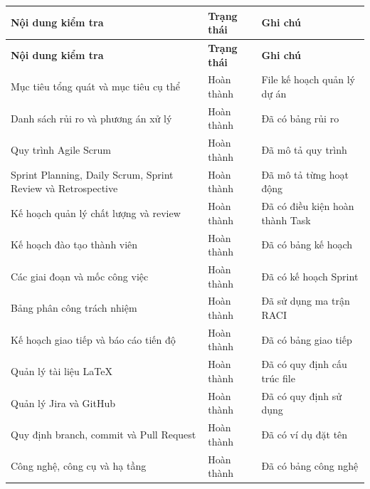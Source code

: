 \documentclass[12pt,a4paper]{article}
\begin{document}
	\begin{longtable}{
			|p{8.8cm}
			|>{\centering\arraybackslash}p{2.3cm}
			|p{3.3cm}|
		}
		\hline
		\textbf{Nội dung kiểm tra} &
		\textbf{Trạng thái} &
		\textbf{Ghi chú} \\
		\hline
		\endfirsthead
		
		\hline
		\textbf{Nội dung kiểm tra} &
		\textbf{Trạng thái} &
		\textbf{Ghi chú} \\
		\hline
		\endhead
		
		Mục tiêu tổng quát và mục tiêu cụ thể &
		Hoàn thành &
		File kế hoạch quản lý dự án \\
		\hline
		
		Danh sách rủi ro và phương án xử lý &
		Hoàn thành &
		Đã có bảng rủi ro \\
		\hline
		
		Quy trình Agile Scrum &
		Hoàn thành &
		Đã mô tả quy trình \\
		\hline
		
		Sprint Planning, Daily Scrum, Sprint Review và Retrospective &
		Hoàn thành &
		Đã mô tả từng hoạt động \\
		\hline
		
		Kế hoạch quản lý chất lượng và review &
		Hoàn thành &
		Đã có điều kiện hoàn thành Task \\
		\hline
		
		Kế hoạch đào tạo thành viên &
		Hoàn thành &
		Đã có bảng kế hoạch \\
		\hline
		
		Các giai đoạn và mốc công việc &
		Hoàn thành &
		Đã có kế hoạch Sprint \\
		\hline
		
		Bảng phân công trách nhiệm &
		Hoàn thành &
		Đã sử dụng ma trận RACI \\
		\hline
		
		Kế hoạch giao tiếp và báo cáo tiến độ &
		Hoàn thành &
		Đã có bảng giao tiếp \\
		\hline
		
		Quản lý tài liệu LaTeX &
		Hoàn thành &
		Đã có quy định cấu trúc file \\
		\hline
		
		Quản lý Jira và GitHub &
		Hoàn thành &
		Đã có quy định sử dụng \\
		\hline
		
		Quy định branch, commit và Pull Request &
		Hoàn thành &
		Đã có ví dụ đặt tên \\
		\hline
		
		Công nghệ, công cụ và hạ tầng &
		Hoàn thành &
		Đã có bảng công nghệ \\
		\hline
		

\end{longtable}
\end{document}
